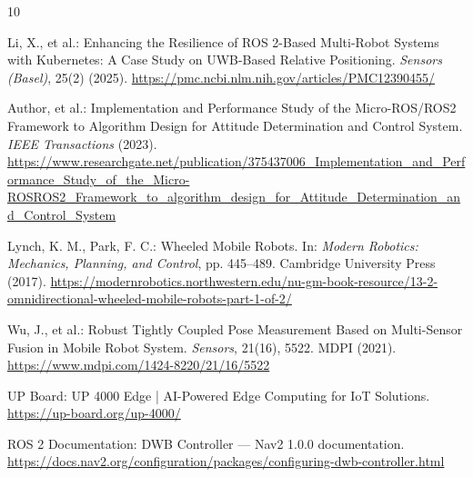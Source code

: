 \documentclass{llncs}
\begin{document}
\begin{thebibliography}{10}

Li, X., et al.: Enhancing the Resilience of ROS 2-Based Multi-Robot Systems with Kubernetes: A Case Study on UWB-Based Relative Positioning. \emph{Sensors (Basel)}, 25(2) (2025). \url{https://pmc.ncbi.nlm.nih.gov/articles/PMC12390455/}

Author, et al.: Implementation and Performance Study of the Micro-ROS/ROS2 Framework to Algorithm Design for Attitude Determination and Control System. \emph{IEEE Transactions} (2023). \url{https://www.researchgate.net/publication/375437006_Implementation_and_Performance_Study_of_the_Micro-ROSROS2_Framework_to_algorithm_design_for_Attitude_Determination_and_Control_System}

Lynch, K. M., Park, F. C.: Wheeled Mobile Robots. In: \emph{Modern Robotics: Mechanics, Planning, and Control}, pp. 445--489. Cambridge University Press (2017). \url{https://modernrobotics.northwestern.edu/nu-gm-book-resource/13-2-omnidirectional-wheeled-mobile-robots-part-1-of-2/}

Wu, J., et al.: Robust Tightly Coupled Pose Measurement Based on Multi-Sensor Fusion in Mobile Robot System. \emph{Sensors}, 21(16), 5522. MDPI (2021). \url{https://www.mdpi.com/1424-8220/21/16/5522}

UP Board: UP 4000 Edge | AI-Powered Edge Computing for IoT Solutions. \url{https://up-board.org/up-4000/}

ROS 2 Documentation: DWB Controller — Nav2 1.0.0 documentation. \url{https://docs.nav2.org/configuration/packages/configuring-dwb-controller.html}

\end{thebibliography}
\end{document}
